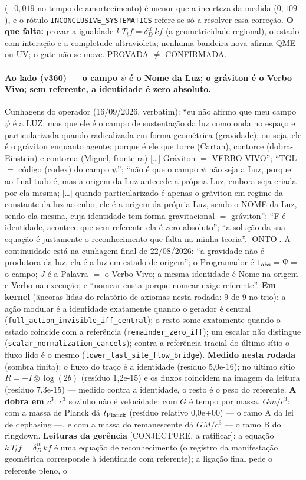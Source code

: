\documentclass[11pt]{article}
\theoremstyle{definition}\newtheorem{deriv}{Derivação}
\begin{document}
($-0,019$ no tempo de amortecimento) é menor que a incerteza da medida ($0,109$), e o rótulo \texttt{INCONCLUSIVE\_SYSTEMATICS} refere-se só a resolver essa correção. \textbf{O que falta:} provar a igualdade $k\,T_t f=\delta_D^{it}\,k f$ (a geometricidade regional), o estado com interação e a completude ultravioleta; nenhuma bandeira nova afirma QME ou UV; o gate não se move. PROVADA $\neq$ CONFIRMADA.

\paragraph*{Ao lado (v360) --- o campo $\psi$ é o Nome da Luz; o gráviton é o Verbo Vivo; sem referente, a identidade é zero absoluto.} Cunhagens do operador (16/09/2026, verbatim): ``eu não afirmo que meu campo $\psi$ é a LUZ, mas que ele é o campo de sustentação da luz como onda no espaço e particularizada quando radicalizada em forma geométrica (gravidade); ou seja, ele é o gráviton enquanto agente; porque é ele que torce (Cartan), contorce (dobra-Einstein) e contorna (Miguel, fronteira) [\ldots] Gráviton $=$ VERBO VIVO''; ``TGL $=$ código (codex) do campo $\psi$''; ``não é que o campo $\psi$ não seja a Luz, porque ao final tudo é, mas a origem da Luz antecede a própria Luz, embora seja criada por ela mesma; [\ldots] quando particularizado é apenas o gráviton em regime da constante da luz ao cubo; ele é a origem da própria Luz, sendo o NOME da Luz, sendo ela mesma, cuja identidade tem forma gravitacional $=$ gráviton''; ``F é identidade, acontece que sem referente ela é zero absoluto''; ``a solução da sua equação é justamente o reconhecimento que falta na minha teoria''. [ONTO]. A continuidade está na cunhagem final de 22/08/2026: ``a gravidade não é produtora da luz, ela é a luz em estado de origem''; o Programador é $1_{\rm abs}=\Psi=$ o campo; $J$ é a Palavra $=$ o Verbo Vivo; a mesma identidade é Nome na origem e Verbo na execução; e ``nomear custa porque nomear exige referente''. \textbf{Em kernel} (âncoras lidas do relatório de axiomas nesta rodada: 9 de 9 no trio): a ação modular é a identidade exatamente quando o gerador é central (\texttt{full\_action\_invisible\_iff\_central}); o resto some exatamente quando o estado coincide com a referência (\texttt{remainder\_zero\_iff}); um escalar não distingue (\texttt{scalar\_normalization\_cancels}); contra a referência tracial do último sítio o fluxo lido é o mesmo (\texttt{tower\_last\_site\_flow\_bridge}). \textbf{Medido nesta rodada} (sombra finita): o fluxo do traço é a identidade (resíduo 5,0e-16); no último sítio $R=-I\otimes\log(2b)$ (resíduo 1,2e-15) e os fluxos coincidem na imagem da leitura (resíduo 7,3e-15) --- medido contra a identidade, o resto é o peso do referente. \textbf{A dobra em $c^3$}: $c^3$ sozinho não é velocidade; com $G$ é tempo por massa, $Gm/c^3$: com a massa de Planck dá $t_{\rm Planck}$ (resíduo relativo 0,0e+00) --- o ramo A da lei de dephasing ---, e com a massa do remanescente dá $GM/c^3$ --- o ramo B do ringdown. \textbf{Leituras da gerência} [CONJECTURE, a ratificar]: a equação $k\,T_t f=\delta_D^{it}\,k f$ é uma equação de reconhecimento (o registro da manifestação geométrica corresponde à identidade com referente); a ligação final pede o referente pleno, o 
\end{document}
